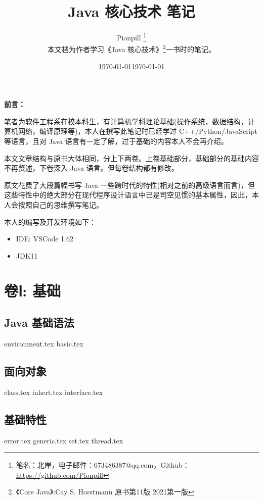 \documentclass{PionpillNote-book}
\title{Java 核心技术 笔记}
\author{
    Pionpill \footnote{笔名：北岸，电子邮件：673486387@qq.com，Github：\url{https://github.com/Pionpill}} \\
    本文档为作者学习《Java 核心技术》\footnote{《Core Java》:Cay S. Horstmann 原书第11版 2021第一版}一书时的笔记。\\
}
\date{\today}
\begin{document}
\pagestyle{plain}
\maketitle

\noindent\textbf{前言：}

笔者为软件工程系在校本科生，有计算机学科理论基础(操作系统，数据结构，计算机网络，编译原理等)，本人在撰写此笔记时已经学过 C++/Python/JavaScript 等语言，且对 Java 语言有一定了解，过于基础的内容本人不会再介绍。

本文文章结构与原书大体相同，分上下两卷。上卷基础部分，基础部分的基础内容不再赘述，下卷深入 Java 语言。但每卷结构都有修改。

原文花费了大段篇幅书写 Java 一些跨时代的特性(相对之前的高级语言而言)，但这些特性中的绝大部分在现代程序设计语言中已是司空见惯的基本属性，因此，本人会按照自己的思维撰写笔记。

本人的编写及开发环境如下：
\begin{itemize}
    \item IDE: VSCode 1.62
    \item JDK11
\end{itemize}

\date{\today}
\newpage

\tableofcontents

\newpage

\setcounter{page}{1} 
\pagestyle{fancy}

\part{卷Ⅰ: 基础}
\chapter{Java 基础语法}
{environment.tex} 
{basic.tex}
\chapter{面向对象}
{class.tex}
{inhert.tex}
{interface.tex}
\chapter{基础特性}
{error.tex}
{generic.tex}
{set.tex}
{thread.tex}
\end{document}
